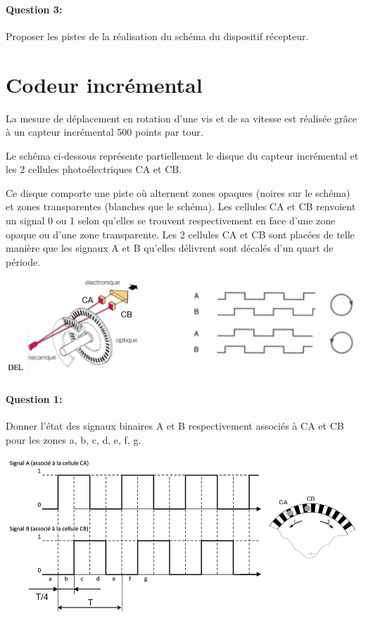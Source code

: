 \paragraph{Question 3:} Proposer les pistes de la réalisation du schéma du dispositif récepteur.

\section{Codeur incrémental}

La mesure de déplacement en rotation d'une vis et de sa vitesse est réalisée grâce à un capteur incrémental 500 points par tour.

Le schéma ci-dessous représente partiellement le disque du capteur incrémental et les 2 cellules photoélectriques CA et CB.

Ce disque comporte une piste où alternent zones opaques (noires sur le schéma) et zones transparentes (blanches que le schéma). Les cellules CA et CB renvoient un signal 0 ou 1 selon qu'elles se trouvent respectivement en face d'une zone opaque ou d'une zone transparente. Les 2 cellules CA et CB sont placées de telle manière que les signaux A et B qu'elles délivrent sont décalés d'un quart de période.

\begin{center}
 \includegraphics[width=0.7\linewidth]{img/figure01}
\end{center}

\paragraph{Question 1:} Donner l'état des signaux binaires A et B respectivement associés à CA et CB pour les zones a, b, c, d, e, f, g.

\begin{center}
 \includegraphics[width=0.7\linewidth]{img/figure02}
\end{center}

